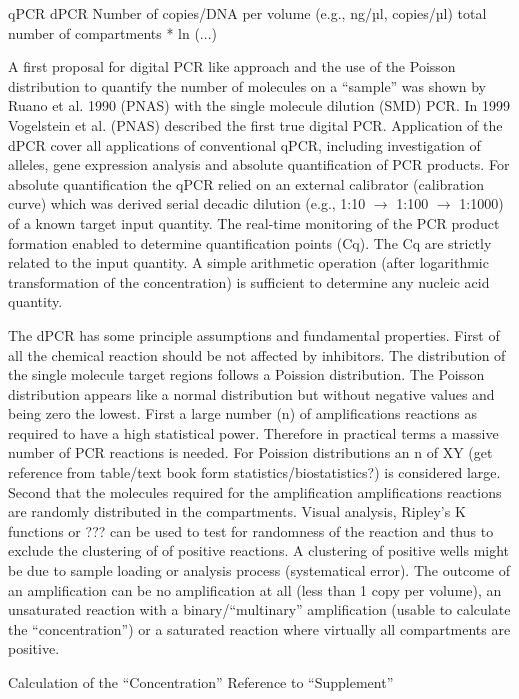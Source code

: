 \documentclass{bioinfo}
\begin{document}
qPCR	dPCR
Number of copies/DNA per volume (e.g., ng/µl, copies/µl)	total number of compartments * ln (...)

A first proposal for digital PCR like approach and the use of the Poisson distribution to quantify the number of molecules on a ``sample'' was shown by Ruano et al. 1990 (PNAS) with the single molecule dilution (SMD) PCR. In 1999 Vogelstein et al. (PNAS) described the first true digital PCR. Application of the dPCR cover all applications of conventional qPCR, including investigation of alleles, gene expression analysis and absolute quantification of PCR products. For absolute quantification the qPCR relied on an external calibrator (calibration curve) which was derived serial decadic dilution (e.g., 1:10 $\rightarrow$ 1:100 $\rightarrow$ 1:1000) of a known target input quantity. The real-time monitoring of the PCR product formation enabled to determine quantification points (Cq). The Cq are strictly related to the input quantity. A simple arithmetic operation (after logarithmic transformation of the concentration) is sufficient to determine any nucleic acid quantity.

The dPCR has some principle assumptions and fundamental properties. First of all the chemical reaction should be not affected by inhibitors. The distribution of the single molecule target regions follows a Poission distribution. The Poisson distribution appears like a normal distribution but without negative values and being zero the lowest. First a large number (n) of amplifications reactions as required to have a high statistical power. Therefore in practical terms a massive number of PCR reactions is needed. For Poission distributions an n of XY (get reference from table/text book form statistics/biostatistics?) is considered large. Second that the molecules required for the amplification amplifications reactions are randomly distributed in the compartments. Visual analysis, Ripley's K functions or ??? can be used to test for randomness of the reaction and thus to exclude the clustering of of positive reactions. A clustering of positive wells might be due to sample loading or analysis process (systematical error). The outcome of an amplification can be no amplification at all (less than 1 copy per volume), an unsaturated reaction with a binary/``multinary'' amplification (usable to calculate the ``concentration'') or a saturated reaction where virtually all compartments are positive.

Calculation of the ``Concentration''
Reference to ``Supplement''
\end{document}
